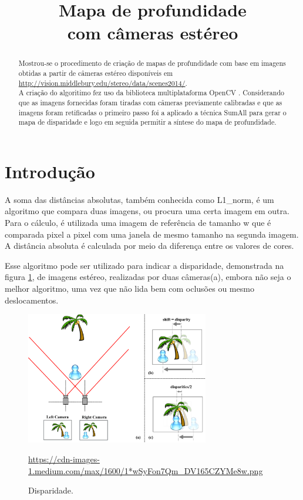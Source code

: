 \documentclass{bmvc2k}
\title{Mapa de profundidade\\ com câmeras estéreo}
\begin{document}
\maketitle

\begin{abstract}
Mostrou-se o procedimento de criação de mapas de profundidade com base em imagens obtidas a partir de câmeras estéreo disponíveis em\\ \url{http://vision.middlebury.edu/stereo/data/scenes2014/}.\\
A criação do algoritimo fez uso da biblioteca multiplataforma OpenCV \cite{openCV}. Considerando que as imagens fornecidas foram tiradas com câmeras previamente calibradas e que as imagens foram retificadas o primeiro passo foi a aplicado a técnica SumAll \cite{SumOfAbsDif} para gerar o mapa de disparidade e logo em seguida permitir a síntese do mapa de profundidade.
\end{abstract}

\section{Introdução}
\label{sec:intro}
 A soma das distâncias absolutas, também conhecida como L1\_norm, é um algoritmo que compara duas imagens, ou procura uma certa imagem em outra. Para o cálculo, é utilizada uma imagem de referência de tamanho w que é comparada pixel a pixel com uma janela de mesmo tamanho na segunda imagem. A distância absoluta é calculada por meio da diferença entre os valores de cores.
 
 Esse algoritmo pode ser utilizado para indicar a disparidade, demonstrada na figura \ref{fig:Disparidade}, de imagens estéreo, realizadas por duas câmeras(a), embora não seja o melhor algoritmo, uma vez que não lida bem com oclusões ou mesmo deslocamentos.
 
 \begin{figure}[!h]
    \centering
    \includegraphics[width = 8cm]{Figs/StereoPicture.png}
    \caption{Disparidade.} 
    \label{fig:Disparidade}
   
    \url{https://cdn-images-1.medium.com/max/1600/1*wSyFon7Qm_DV165CZYMe8w.png}
\end{figure}
\end{document}
